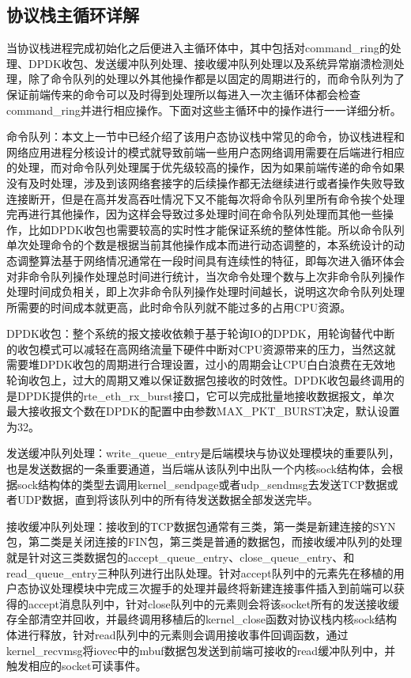 \subsection{协议栈主循环详解} %
当协议栈进程完成初始化之后便进入主循环体中，其中包括对command\_ring的处理、DPDK收包、发送缓冲队列处理、接收缓冲队列处理以及系统异常崩溃检测处理，除了命令队列的处理以外其他操作都是以固定的周期进行的，而命令队列为了保证前端传来的命令可以及时得到处理所以每进入一次主循环体都会检查command\_ring并进行相应操作。下面对这些主循环中的操作进行一一详细分析。

命令队列：本文上一节中已经介绍了该用户态协议栈中常见的命令，协议栈进程和网络应用进程分核设计的模式就导致前端一些用户态网络调用需要在后端进行相应的处理，而对命令队列处理属于优先级较高的操作，因为如果前端传递的命令如果没有及时处理，涉及到该网络套接字的后续操作都无法继续进行或者操作失败导致连接断开，但是在高并发高吞吐情况下又不能每次将命令队列里所有命令挨个处理完再进行其他操作，因为这样会导致过多处理时间在命令队列处理而其他一些操作，比如DPDK收包也需要较高的实时性才能保证系统的整体性能。所以命令队列单次处理命令的个数是根据当前其他操作成本而进行动态调整的，本系统设计的动态调整算法基于网络情况通常在一段时间具有连续性的特征，即每次进入循环体会对非命令队列操作处理总时间进行统计，当次命令处理个数与上次非命令队列操作处理时间成负相关，即上次非命令队列操作处理时间越长，说明这次命令队列处理所需要的时间成本就更高，此时命令队列就不能过多的占用CPU资源。

DPDK收包：整个系统的报文接收依赖于基于轮询IO的DPDK，用轮询替代中断的收包模式可以减轻在高网络流量下硬件中断对CPU资源带来的压力，当然这就需要堆DPDK收包的周期进行合理设置，过小的周期会让CPU白白浪费在无效地轮询收包上，过大的周期又难以保证数据包接收的时效性。DPDK收包最终调用的是DPDK提供的rte\_eth\_rx\_burst接口，它可以完成批量地接收数据报文，单次最大接收报文个数在DPDK的配置中由参数MAX\_PKT\_BURST决定，默认设置为32。

发送缓冲队列处理：write\_queue\_entry是后端模块与协议处理模块的重要队列，也是发送数据的一条重要通道，当后端从该队列中出队一个内核sock结构体，会根据sock结构体的类型去调用kernel\_sendpage或者udp\_sendmsg去发送TCP数据或者UDP数据，直到将该队列中的所有待发送数据全部发送完毕。

接收缓冲队列处理：接收到的TCP数据包通常有三类，第一类是新建连接的SYN包，第二类是关闭连接的FIN包，第三类是普通的数据包，而接收缓冲队列的处理就是针对这三类数据包的accept\_queue\_entry、close\_queue\_entry、和read\_queue\_entry三种队列进行出队处理。针对accept队列中的元素先在移植的用户态协议处理模块中完成三次握手的处理并最终将新建连接事件插入到前端可以获得的accept消息队列中，针对close队列中的元素则会将该socket所有的发送接收缓存全部清空并回收，并最终调用移植后的kernel\_close函数对协议栈内核sock结构体进行释放，针对read队列中的元素则会调用接收事件回调函数，通过kernel\_recvmsg将iovec中的mbuf数据包发送到前端可接收的read缓冲队列中，并触发相应的socket可读事件。

